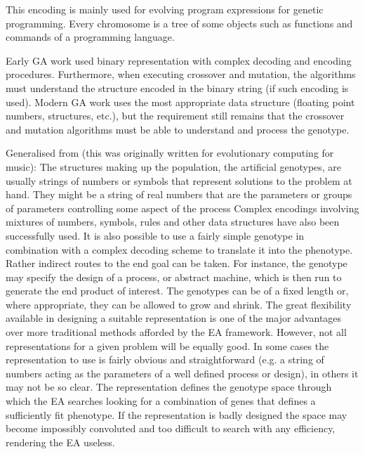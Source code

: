 This encoding is mainly used for evolving program expressions for genetic programming.
Every chromosome is a tree of some objects such as functions and commands
of a programming language.

Early GA work used binary representation with complex decoding and encoding procedures. Furthermore, when executing crossover and mutation, the algorithms must understand the structure encoded in the binary string (if such encoding is used). Modern GA work uses the most appropriate data structure (floating point numbers, structures, etc.), but the requirement still remains that the crossover and mutation algorithms must be able to understand and process the genotype.


Generalised from \cite{Husbands2007} (this was originally written for evolutionary computing for music):
The structures making up the population, the artificial genotypes, are usually strings
of numbers or symbols that represent solutions to the problem at hand. They might be
a string of real numbers that are the parameters or groups of parameters controlling some aspect of the process
Complex encodings involving mixtures of numbers, symbols, rules and other
data structures have also been successfully used. It is also possible to use a fairly simple genotype in
combination with a complex decoding scheme to translate it into the phenotype.
Rather indirect routes to the end goal can be taken. For instance, the genotype may
specify the design of a process, or abstract machine, which is then run to generate the
end product of interest. The genotypes can be of a fixed length
or, where appropriate, they can be allowed to grow and shrink. The great flexibility
available in designing a suitable representation is one of the major advantages over
more traditional methods afforded by the EA framework. However, not all
representations for a given problem will be equally good. In some cases the
representation to use is fairly obvious and straightforward (e.g. a string of numbers
acting as the parameters of a well defined process or design), in others it may not be
so clear. The representation defines the genotype space through which the EA
searches looking for a combination of genes that defines a sufficiently fit phenotype.
If the representation is badly designed the space may become impossibly convoluted
and too difficult to search with any efficiency, rendering the EA useless. 


